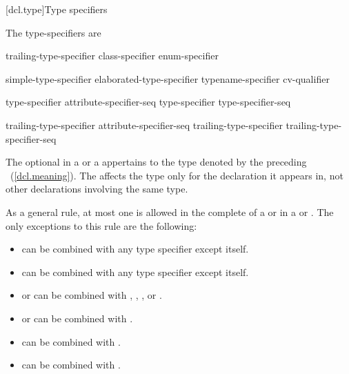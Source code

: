 [dcl.type]{Type specifiers}%

\pnum
The type-specifiers are

%
%
%
\begin{bnf}
\br
    trailing-type-specifier\br
    class-specifier\br
    enum-specifier
\end{bnf}

\begin{bnf}
\br
  simple-type-specifier\br
  elaborated-type-specifier\br
  typename-specifier\br
  cv-qualifier
\end{bnf}

\begin{bnf}
\br
    type-specifier attribute-specifier-seq\opt\br
    type-specifier type-specifier-seq
\end{bnf}

\begin{bnf}
\br
  trailing-type-specifier attribute-specifier-seq\opt\br
  trailing-type-specifier trailing-type-specifier-seq
\end{bnf}

The optional  in a 
or a 
appertains
to the type denoted by the preceding ~(\ref{dcl.meaning}). The
 affects the type only for the declaration it appears in,
not other declarations involving the same type.

\pnum
As a general rule, at most one  is allowed in the complete
 of a  or in a
 or .
The only exceptions to this rule are the following:

\begin{itemize}
\item {} can be combined with any type specifier except itself.

\item {} can be combined with any type specifier except itself.

\item {} or  can be combined with
, , , or .

\item {} or  can be combined with .

\item {} can be combined with .

\item {} can be combined with .
\end{itemize}

